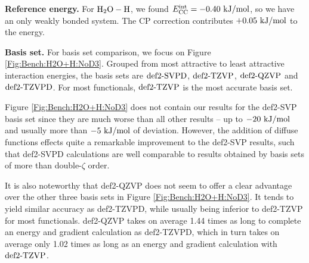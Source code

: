\textbf{Reference energy.} For $\mbox{\ensuremath{\text H _2 \text O-\text H}}$, we found \mbox{$E^{\text{int}}_{\text {CC}}=-0.40\ \text {kJ/mol}$}, so
we have an only weakly bonded system. The CP correction contributes $+0.05\ \text {kJ/mol}$ to
the energy.

\textbf{Basis set.} For basis set comparison, we focus on Figure
\ref{Fig:Bench:H2O+H:NoD3}. Grouped from most attractive to least attractive
interaction energies, the basis sets are $\text{def2-SVPD}$, $\text{def2-TZVP}$, $\text{def2-QZVP}$ and $\text{def2-TZVPD}$.
For most functionals, $\text{def2-TZVP}$ is the most accurate basis set.

Figure \ref{Fig:Bench:H2O+H:NoD3} does not contain our results for the def2-SVP basis
set since they are much worse than all other results -- up to $-20\ \kmo$ and
usually more than $-5\ \kmo$ of deviation. However, the addition of diffuse
functions effects quite a remarkable improvement to the def2-SVP results, such
that def2-SVPD calculations are well comparable to results obtained by basis
sets of more than double-$\zeta$ order.

It is also noteworthy that def2-QZVP does not seem to offer a clear advantage over the
other three basis sets in Figure \ref{Fig:Bench:H2O+H:NoD3}. It tends to yield
similar accuracy as def2-TZVPD, while usually being inferior to def2-TZVP for
most functionals. def2-QZVP takes on average 1.44 times as long to complete an
energy and gradient calculation as def2-TZVPD, which in turn takes
on average only 1.02 times as long as an energy and gradient calculation with
$\text{def2-TZVP}$.

